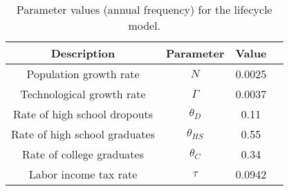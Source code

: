 \documentclass{article}
\begin{document}
\addtocounter{table}{1}
\begin{sidewaystable}[ht]
    \centering
    \begin{tabular}{cccc}
        \toprule
        Description & Parameter & Value  \\
        \midrule
        Population growth rate & $N$ & 0.0025  \\
        Technological growth rate & $\Gamma$ & 0.0037  \\
        Rate of high school dropouts & $\theta_D $ & 0.11  \\
        Rate of high school graduates & $\theta_{HS} $ & 0.55  \\
        Rate of college graduates & $\theta_C $ & 0.34  \\
        Labor income tax rate & $\tau$ & 0.0942  \\
        \bottomrule
    \end{tabular}
    \caption{Parameter values (annual frequency) for the lifecycle model.}
    \label{tab:calib2}
\end{sidewaystable}
\end{document}
